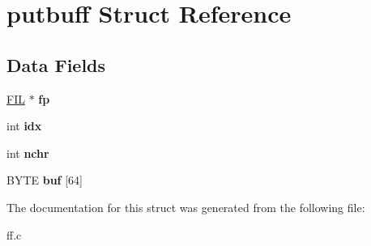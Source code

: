 \hypertarget{structputbuff}{}\section{putbuff Struct Reference}
\label{structputbuff}
\subsection*{Data Fields}
\begin{DoxyCompactItemize}
\item 
\mbox{\label{structputbuff_a5c7baa85e569be17f4888f5d92f4453c}} 
\hyperlink{struct_f_i_l}{F\+IL} $\ast$ {\bfseries fp}
\item 
\mbox{\label{structputbuff_a10a3ca93af8df07e9836ebd5230c06d8}} 
int {\bfseries idx}
\item 
\mbox{\label{structputbuff_a125366bfe48077e6f562f95e30b4604a}} 
int {\bfseries nchr}
\item 
\mbox{\label{structputbuff_ae623199e5d2851f95050670170f20329}} 
B\+Y\+TE {\bfseries buf} \mbox{[}64\mbox{]}
\end{DoxyCompactItemize}


The documentation for this struct was generated from the following file\+:\begin{DoxyCompactItemize}
\item 
ff.\+c\end{DoxyCompactItemize}
